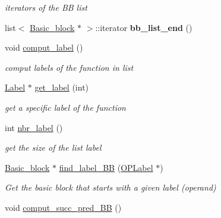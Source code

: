 \begin{DoxyCompactItemize}
\begin{DoxyCompactList}\small\item\em iterators of the B\+B list \end{DoxyCompactList}\item 
\hypertarget{class_function_a06be1b0a730b4ead3da6bb5529df9788}{}list$<$ \hyperlink{class_basic__block}{Basic\+\_\+block} $\ast$ $>$\+::iterator {\bfseries bb\+\_\+list\+\_\+end} ()\label{class_function_a06be1b0a730b4ead3da6bb5529df9788}

\item 
\hypertarget{class_function_a1c8830219ce4306c22a933b17f54cc6f}{}void \hyperlink{class_function_a1c8830219ce4306c22a933b17f54cc6f}{comput\+\_\+label} ()\label{class_function_a1c8830219ce4306c22a933b17f54cc6f}

\begin{DoxyCompactList}\small\item\em comput labels of the function in list \end{DoxyCompactList}\item 
\hypertarget{class_function_a4b2e9837c4b506b3c7a6d1488d9914d1}{}\hyperlink{class_label}{Label} $\ast$ \hyperlink{class_function_a4b2e9837c4b506b3c7a6d1488d9914d1}{get\+\_\+label} (int)\label{class_function_a4b2e9837c4b506b3c7a6d1488d9914d1}

\begin{DoxyCompactList}\small\item\em get a specific label of the function \end{DoxyCompactList}\item 
\hypertarget{class_function_a3f3807e12e695ffe23e1ef44edcd262b}{}int \hyperlink{class_function_a3f3807e12e695ffe23e1ef44edcd262b}{nbr\+\_\+label} ()\label{class_function_a3f3807e12e695ffe23e1ef44edcd262b}

\begin{DoxyCompactList}\small\item\em get the size of the list label \end{DoxyCompactList}\item 
\hypertarget{class_function_ae55c0232d0eced8830daf57293229db8}{}\hyperlink{class_basic__block}{Basic\+\_\+block} $\ast$ \hyperlink{class_function_ae55c0232d0eced8830daf57293229db8}{find\+\_\+label\+\_\+\+B\+B} (\hyperlink{class_o_p_label}{O\+P\+Label} $\ast$)\label{class_function_ae55c0232d0eced8830daf57293229db8}

\begin{DoxyCompactList}\small\item\em Get the basic block that starts with a given label (operand) \end{DoxyCompactList}\item 
\hypertarget{class_function_a3c52c8cb82e0137f02771331018b655c}{}void \hyperlink{class_function_a3c52c8cb82e0137f02771331018b655c}{comput\+\_\+succ\+\_\+pred\+\_\+\+B\+B} ()\label{class_function_a3c52c8cb82e0137f02771331018b655c}


\end{DoxyCompactItemize}

